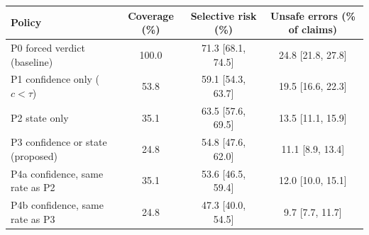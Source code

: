 \begin{tabular}{@{}lccc@{}}
\toprule
Policy & Coverage (\%) & Selective risk (\%) & Unsafe errors (\% of claims) \\
\midrule
P0 forced verdict (baseline) & 100.0 & 71.3 [68.1, 74.5] & 24.8 [21.8, 27.8] \\
\midrule
P1 confidence only ($c<\tau$) & 53.8 & 59.1 [54.3, 63.7] & 19.5 [16.6, 22.3] \\
P2 state only & 35.1 & 63.5 [57.6, 69.5] & 13.5 [11.1, 15.9] \\
P3 confidence or state (proposed) & 24.8 & 54.8 [47.6, 62.0] & 11.1 [8.9, 13.4] \\
\midrule
P4a confidence, same rate as P2 & 35.1 & 53.6 [46.5, 59.4] & 12.0 [10.0, 15.1] \\
P4b confidence, same rate as P3 & 24.8 & 47.3 [40.0, 54.5] & 9.7 [7.7, 11.7] \\
\bottomrule
\end{tabular}
